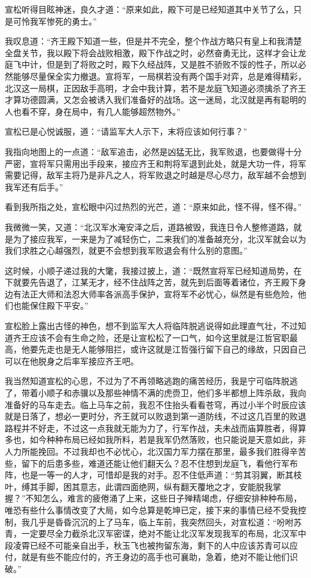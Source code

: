 宣松听得目眩神迷，良久才道：“原来如此，殿下可是已经知道其中关节了么，只是可怜我军惨死的勇士。”

我叹息道：“齐王殿下知道一些，但是并不完全，整个作战方略只有皇上和我清楚全盘关节，我以殿下将会战败相激，殿下作战之时，必然奋勇无比，这样才会让龙庭飞中计，但是到了将败之时，殿下久经战阵，又是胜不骄败不馁的性子，所以必然能够尽量保全实力撤退。宣将军，一局棋若没有两个国手对弈，总是难得精彩，北汉这一局棋，正因敌手高明，才会中我计算，若不是龙庭飞知道必须擒杀了齐王才算功德圆满，又怎会被诱入我们准备好的战场。这一迷局，北汉就是再有聪明的人也看不穿，身在局中，有几人能够超然物外。”

宣松已是心悦诚服，道：“请监军大人示下，末将应该如何行事？”

我指向地图上的一点道：“敌军追击，必然是凶猛无比，我军败退，也要做得十分严密，宣将军只需用出手段来，接应齐王和荆将军退到此处，就是大功一件，将军需要记得，敌军主将乃是非凡之人，将军败退之时越是尽心尽力，敌军越不会想到我军还有后手。”

看到我所指之处，宣松眼中闪过热烈的光芒，道：“原来如此，怪不得，怪不得。”

我微微一笑，又道：“北汉军水淹安泽之后，道路被毁，我连日令人整修道路，就是为了接应我军，一来是为了减轻伤亡，二来我们的准备越充分，北汉军就会以为我们求胜之心越强烈，就更不会想到我军败退会有什么别的意图。”

这时候，小顺子递过我的大氅，我接过披上，道：“既然宣将军已经知道局势，在下就要先告退了，江某无才，经不住战阵之苦，就先到后面等着诸位，齐王殿下身边有法正大师和法忍大师率各派高手保护，宣将军不必忧心，纵然是有些危险，他们也能保住殿下平安。”

宣松脸上露出古怪的神色，想不到监军大人将临阵脱逃说得如此理直气壮，不过知道齐王应该不会有生命之险，还是让宣松松了一口气，如今这里就是江哲官职最高，他要先走也是无人能够阻拦，或许这就是江哲强行留下自己的缘故，只因自己可以在他脱身之后率军接应齐王吧。

我当然知道宣松的心思，不过为了不再领略逃跑的痛苦经历，我是宁可临阵脱逃了，带着小顺子和赤骥以及那些神情不满的虎赍卫，他们多半都想上阵杀敌，我向准备好的马车走去。临上马车之前，我忍不住抬头看看苍穹，再过小半个时辰应该就是日落了，想必一更时分，齐王就可以败退到第一道防线，不过这几百里的败退路程并不好走，不过这一点我就无能为力了，行军作战，夫未战而庙算胜者，得算多也，如今种种布局已经如我所料，若是我军仍然落败，也只能说是天意如此，非人力所能挽回。不过我却也不必忧心，北汉国力军力摆在那里，最多我们胜得辛苦些，留下的后患多些，难道还能让他们翻天么？忍不住想到龙庭飞，看他行军布阵，也是一等一的人才，可惜却是我的对手。忍不住低声道：“剪其羽翼，断其枝叶，缚其手脚，困其意志，此谓四面绝网，纵有翻天覆地之才，安能脱我掌握？”不知怎么，难言的疲倦涌了上来，这些日子殚精竭虑，仔细安排种种布局，唯恐有些什么事情改变了大局，如今总算是乾坤已定，接下来的事情已经不受我控制，我几乎是昏昏沉沉的上了马车，临上车前，我突然回头，对宣松道：“吩咐苏青，一定要尽全力截杀北汉军密谍，绝对不能让北汉军发现我军的布局，北汉军中段凌霄已经不可能亲自出手，秋玉飞也被拘留东海，剩下的人中应该苏青可以应付，就是有些不能应付的，齐王身边的高手也可襄助，急着，绝对不能让他们识破。”

